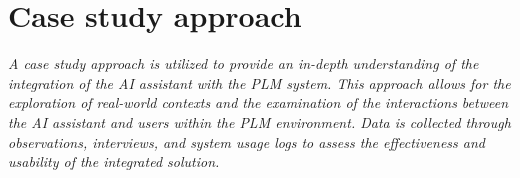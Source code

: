 \section{Case study approach}
\label{sec:case-study-approach}


\textit{A case study approach is utilized to provide an in-depth understanding of the integration of the AI assistant with the PLM system. This approach allows for the exploration of real-world contexts and the examination of the interactions between the AI assistant and users within the PLM environment. Data is collected through observations, interviews, and system usage logs to assess the effectiveness and usability of the integrated solution.}
